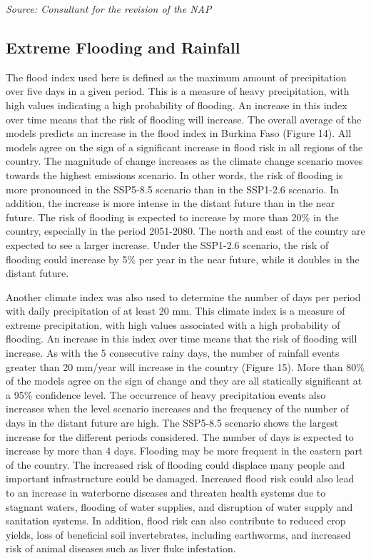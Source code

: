 \documentclass[
]{book}
\begin{document}
\emph{Source: Consultant for the revision of the NAP}

\subsection{Extreme Flooding and Rainfall}\label{extreme-flooding-and-rainfall}

The flood index used here is defined as the maximum amount of precipitation over five days in a given period. This is a measure of heavy precipitation, with high values indicating a high probability of flooding. An increase in this index over time means that the risk of flooding will increase. The overall average of the models predicts an increase in the flood index in Burkina Faso (Figure 14). All models agree on the sign of a significant increase in flood risk in all regions of the country. The magnitude of change increases as the climate change scenario moves towards the highest emissions scenario. In other words, the risk of flooding is more pronounced in the SSP5-8.5 scenario than in the SSP1-2.6 scenario. In addition, the increase is more intense in the distant future than in the near future. The risk of flooding is expected to increase by more than 20\% in the country, especially in the period 2051-2080. The north and east of the country are expected to see a larger increase. Under the SSP1-2.6 scenario, the risk of flooding could increase by 5\% per year in the near future, while it doubles in the distant future.

Another climate index was also used to determine the number of days per period with daily precipitation of at least 20 mm. This climate index is a measure of extreme precipitation, with high values associated with a high probability of flooding. An increase in this index over time means that the risk of flooding will increase. As with the 5 consecutive rainy days, the number of rainfall events greater than 20 mm/year will increase in the country (Figure 15). More than 80\% of the models agree on the sign of change and they are all statically significant at a 95\% confidence level. The occurrence of heavy precipitation events also increases when the level scenario increases and the frequency of the number of days in the distant future are high. The SSP5-8.5 scenario shows the largest increase for the different periods considered. The number of days is expected to increase by more than 4 days. Flooding may be more frequent in the eastern part of the country. The increased risk of flooding could displace many people and important infrastructure could be damaged. Increased flood risk could also lead to an increase in waterborne diseases and threaten health systems due to stagnant waters, flooding of water supplies, and disruption of water supply and sanitation systems. In addition, flood risk can also contribute to reduced crop yields, loss of beneficial soil invertebrates, including earthworms, and increased risk of animal diseases such as liver fluke infestation.
\end{document}
